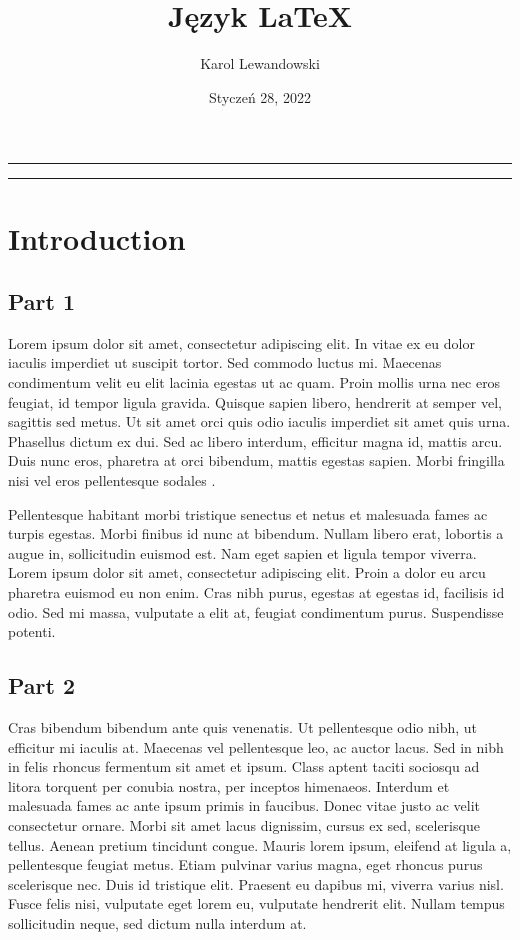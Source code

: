 \documentclass[a4paper, 12pt]{article}
\title{\Large{\textbf{Język LaTeX}}}
\author{Karol Lewandowski}
\date{Styczeń 28, 2022}
\begin{document}
\maketitle
\newpage

\rule{\textwidth}{0.5pt}
\begin{abstract}
	\noindent\blindtext[1]
\end{abstract}
\rule{\textwidth}{0.5pt}

\section{Introduction}
\subsection{Part 1}
Lorem ipsum dolor sit amet, consectetur adipiscing elit. In vitae ex eu dolor iaculis imperdiet ut suscipit tortor. Sed commodo luctus mi. Maecenas condimentum velit eu elit lacinia egestas ut ac quam. Proin mollis urna nec eros feugiat, id tempor ligula gravida. Quisque sapien libero, hendrerit at semper vel, sagittis sed metus. Ut sit amet orci quis odio iaculis imperdiet sit amet quis urna. Phasellus dictum ex dui. Sed ac libero interdum, efficitur magna id, mattis arcu. Duis nunc eros, pharetra at orci bibendum, mattis egestas sapien. Morbi fringilla nisi vel eros pellentesque sodales \cite{dirac}.

Pellentesque habitant morbi tristique senectus et netus et malesuada fames ac turpis egestas. Morbi finibus id nunc at bibendum. Nullam libero erat, lobortis a augue in, sollicitudin euismod est. Nam eget sapien et ligula tempor viverra. Lorem ipsum dolor sit amet, consectetur adipiscing elit. Proin a dolor eu arcu pharetra euismod eu non enim. Cras nibh purus, egestas at egestas id, facilisis id odio. Sed mi massa, vulputate a elit at, feugiat condimentum purus. Suspendisse potenti.
\subsection{Part 2}
Cras bibendum bibendum ante quis venenatis. Ut pellentesque odio nibh, ut efficitur mi iaculis at. Maecenas vel pellentesque leo, ac auctor lacus. Sed in nibh in felis rhoncus fermentum sit amet et ipsum. Class aptent taciti sociosqu ad litora torquent per conubia nostra, per inceptos himenaeos. Interdum et malesuada fames ac ante ipsum primis in faucibus. Donec vitae justo ac velit consectetur ornare. Morbi sit amet lacus dignissim, cursus ex sed, scelerisque tellus. Aenean pretium tincidunt congue. Mauris lorem ipsum, eleifend at ligula a, pellentesque feugiat metus. Etiam pulvinar varius magna, eget rhoncus purus scelerisque nec. Duis id tristique elit. Praesent eu dapibus mi, viverra varius nisl. Fusce felis nisi, vulputate eget lorem eu, vulputate hendrerit elit. Nullam tempus sollicitudin neque, sed dictum nulla interdum at.
\end{document}
